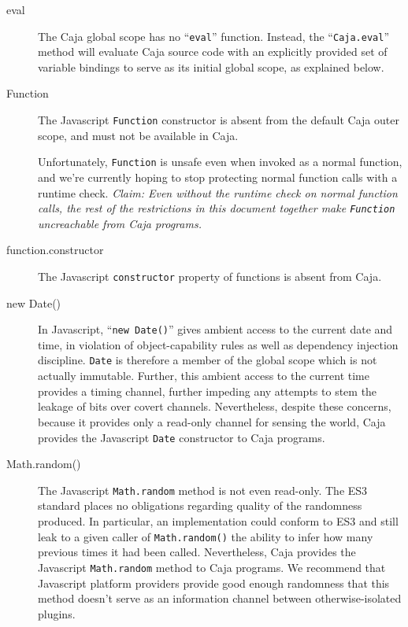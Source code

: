 \documentclass[letterpaper,twocolumn,10pt]{article}
\newcommand{\code}[1]{{\tt {#1}}}              %
\begin{document}
\begin{description}

    \item[eval] The Caja global scope has no ``\code{eval}'' function. 
    Instead, the ``\code{Caja.eval}'' method will evaluate Caja source code 
    with an explicitly provided set of variable bindings to serve as its 
    initial global scope, as explained below.
    
    \item[Function] The Javascript \code{Function} constructor is absent from 
    the default Caja outer scope, and must not be available in Caja. 

    Unfortunately, \code{Function} is unsafe even when invoked as a normal 
    function, and we're currently hoping to stop protecting normal function 
    calls with a runtime check. \emph{Claim: Even without the runtime check 
    on normal function calls, the rest of the restrictions in this document 
    together make \code{Function} uncreachable from Caja programs.}
    
    \item[function.constructor] The Javascript \code{constructor} property of 
    functions is absent from Caja.

    \item[new Date()] In Javascript, ``\code{new Date()}''  gives ambient 
    access to the current date and time, in violation of object-capability 
    rules as well as dependency injection discipline. \code{Date} is 
    therefore a member of the global scope which is not actually immutable. 
    Further, this ambient access to the current time provides a timing 
    channel, further impeding any attempts to stem the leakage of bits over 
    covert channels. Nevertheless, despite these concerns, because it 
    provides only a read-only channel for sensing the world, Caja provides 
    the Javascript \code{Date} constructor to Caja programs.

    \item[Math.random()] The Javascript \code{Math.random} method is not even 
    read-only. The ES3 standard places no obligations regarding quality of the
    randomness produced. In particular, an implementation could conform to ES3
    and still leak to a given caller of \code{Math.random()} the ability to
    infer how many previous times it had been called. Nevertheless, Caja
    provides the Javascript \code{Math.random} method to Caja programs. We
    recommend that Javascript platform providers provide good enough
    randomness that this method doesn't serve as an information channel
    between otherwise-isolated plugins.
    
\end{description}
\end{document}
